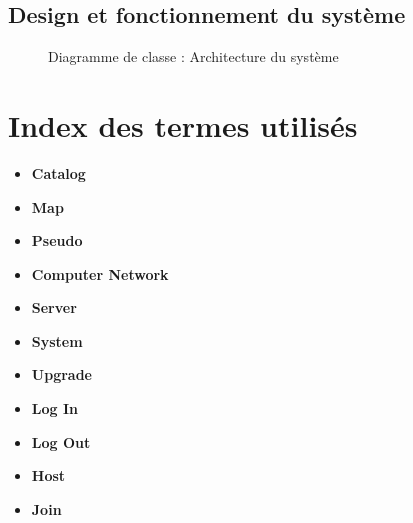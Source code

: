 \documentclass[a4paper,11pt]{report}
\begin{document}
\section{Design et fonctionnement du système}
\begin{figure}[ht]
    \caption{Diagramme de classe : Architecture du système}
\end{figure}


\newpage
\chapter{Index des termes utilisés}
\begin{itemize}
 \item \textbf{Catalog}
 \item \textbf{Map}
 \item \textbf{Pseudo}
 \item \textbf{Computer Network}
 \item \textbf{Server}
 \item \textbf{System}
 \item \textbf{Upgrade}
 \item \textbf{Log In}
 \item \textbf{Log Out}
 \item \textbf{Host}
 \item \textbf{Join}
\end{itemize}
\end{document}
